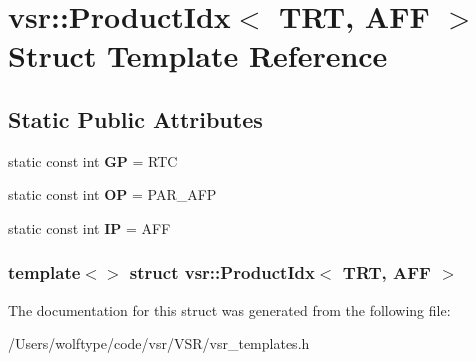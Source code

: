 \hypertarget{structvsr_1_1_product_idx_3_01_t_r_t_00_01_a_f_f_01_4}{\section{vsr\-:\-:Product\-Idx$<$ T\-R\-T, A\-F\-F $>$ Struct Template Reference}
\label{structvsr_1_1_product_idx_3_01_t_r_t_00_01_a_f_f_01_4}
}
\subsection*{Static Public Attributes}
\begin{DoxyCompactItemize}
\item 
\hypertarget{structvsr_1_1_product_idx_3_01_t_r_t_00_01_a_f_f_01_4_a6413ad3848a03fa32a0f7688c77ebe52}{static const int {\bfseries G\-P} = R\-T\-C}\label{structvsr_1_1_product_idx_3_01_t_r_t_00_01_a_f_f_01_4_a6413ad3848a03fa32a0f7688c77ebe52}

\item 
\hypertarget{structvsr_1_1_product_idx_3_01_t_r_t_00_01_a_f_f_01_4_ae1d4dd495672de7f453b2f4c77edda36}{static const int {\bfseries O\-P} = P\-A\-R\-\_\-\-A\-F\-P}\label{structvsr_1_1_product_idx_3_01_t_r_t_00_01_a_f_f_01_4_ae1d4dd495672de7f453b2f4c77edda36}

\item 
\hypertarget{structvsr_1_1_product_idx_3_01_t_r_t_00_01_a_f_f_01_4_a6219a19d3bfdfb49cd488f96597a6041}{static const int {\bfseries I\-P} = A\-F\-F}\label{structvsr_1_1_product_idx_3_01_t_r_t_00_01_a_f_f_01_4_a6219a19d3bfdfb49cd488f96597a6041}

\end{DoxyCompactItemize}
\subsubsection*{template$<$$>$ struct vsr\-::\-Product\-Idx$<$ T\-R\-T, A\-F\-F $>$}



The documentation for this struct was generated from the following file\-:\begin{DoxyCompactItemize}
\item 
/\-Users/wolftype/code/vsr/\-V\-S\-R/vsr\-\_\-templates.\-h\end{DoxyCompactItemize}
